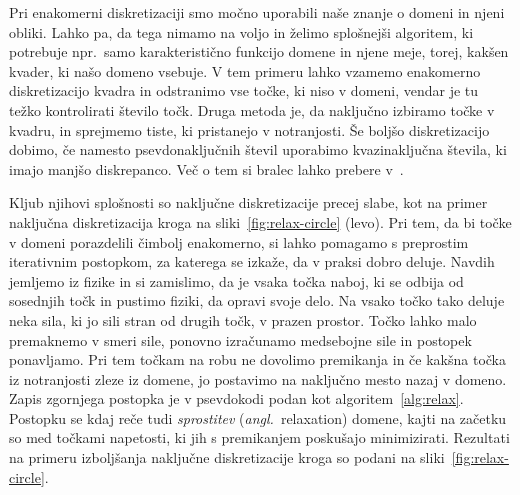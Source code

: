 \documentclass[12pt,a4paper,twoside]{article}
\theoremstyle{definition} %
\theoremstyle{plain} %
\numberwithin{equation}{section}
\newcommand{\ang}[1]{(\textit{angl.}\ #1)}
\begin{document}
Pri enakomerni diskretizaciji smo močno uporabili naše znanje o domeni in njeni
obliki. Lahko pa, da tega nimamo na voljo in želimo splošnejši algoritem, ki
potrebuje npr.~samo karakteristično funkcijo domene in njene meje, torej, kakšen
kvader, ki našo domeno vsebuje.
V tem primeru lahko vzamemo enakomerno diskretizacijo kvadra in odstranimo vse
točke, ki niso v domeni, vendar je tu težko kontrolirati število točk.
Druga metoda je, da naključno izbiramo točke v kvadru, in sprejmemo tiste, ki
pristanejo v notranjosti. Še boljšo diskretizacijo dobimo, če namesto
psevdonaključnih števil uporabimo kvazinaključna števila, ki imajo manjšo
diskrepanco. Več o tem si bralec lahko prebere v~\cite{morokoff1994quasi}.

Kljub njihovi splošnosti so naključne diskretizacije precej slabe, kot na primer
naključna diskretizacija kroga na sliki~\ref{fig:relax-circle} (levo).
Pri tem, da bi točke v domeni porazdelili čimbolj enakomerno, si lahko pomagamo
s preprostim iterativnim postopkom, za katerega se izkaže, da v praksi dobro
deluje. Navdih jemljemo iz fizike in si zamislimo, da je vsaka točka naboj, ki
se odbija od sosednjih točk in pustimo fiziki, da opravi svoje delo.
Na vsako točko tako deluje neka sila, ki jo sili
stran od drugih točk, v prazen prostor. Točko lahko malo premaknemo v smeri
sile, ponovno izračunamo medsebojne sile in postopek ponavljamo. Pri tem točkam
na robu ne dovolimo premikanja in če kakšna točka iz notranjosti zleze iz
domene, jo postavimo na naključno mesto nazaj v domeno. Zapis zgornjega postopka
je v psevdokodi podan kot algoritem~\ref{alg:relax}. Postopku se kdaj reče
tudi \emph{sprostitev} \ang{relaxation} domene, kajti na začetku so med točkami
napetosti, ki jih s premikanjem poskušajo minimizirati. Rezultati na primeru
izboljšanja naključne diskretizacije kroga so podani na
sliki~\ref{fig:relax-circle}.
\end{document}
